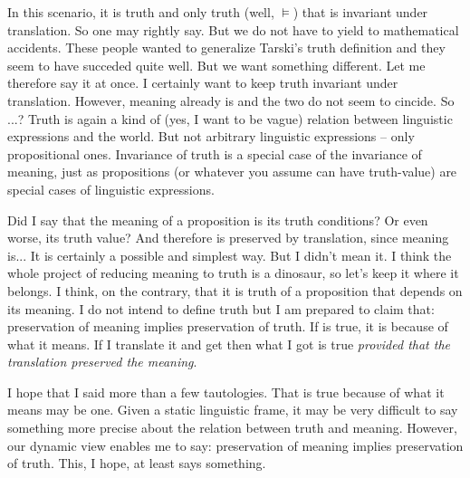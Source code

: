 \documentclass[10pt]{article}
\begin{document}
In this scenario, it is truth and only truth (well, $\models$) that is 
invariant under translation. So one may rightly say. But we do not have to 
yield to mathematical accidents. These people wanted to generalize Tarski's 
truth definition and they seem to have succeded quite well. But we want 
something different. Let me therefore say it at once. I certainly want to 
keep truth invariant under translation. However, meaning already is and 
the two do not seem to cincide. So ...? Truth is again a kind of (yes, I 
want to be vague) relation between linguistic expressions and the world. But 
not arbitrary linguistic expressions -- only propositional ones. Invariance 
of truth is a special case of the invariance of meaning, just as 
propositions (or whatever you assume can have truth-value) are special 
cases of linguistic expressions. 

Did I say that the meaning of a proposition is its truth conditions? Or even 
worse, its truth value? And therefore is preserved by translation, since 
meaning is... It is certainly a possible and simplest way. But I didn't mean 
it. I think the whole project of reducing meaning to truth is a dinosaur, 
so let's keep it where it belongs. I think, on the contrary, that it is 
truth of a proposition that depends on its meaning. I do not intend to 
define truth but I am prepared to claim that: preservation of 
meaning implies preservation of truth. If  is true, it 
is because of what it means. If I translate it and get  
then what I got is true {\em provided that the translation preserved the 
meaning}. 

I hope that I said more than a few tautologies. That  
is true because of what it means may be one. Given a static linguistic frame, 
it may be very difficult to say something more precise about the relation 
between truth and meaning. However, our dynamic view enables me to say: 
preservation of meaning implies preservation of truth. This, I hope, at 
least says something.
\end{document}

